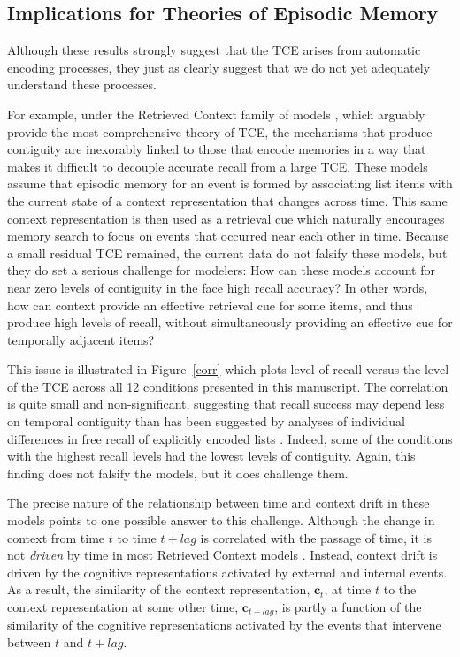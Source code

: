 \documentclass[man,natbib,floatsintext]{apa6} %
\begin{document}
\subsection{Implications for Theories of Episodic Memory}
Although these results strongly suggest that the TCE arises from automatic encoding processes, they just as clearly suggest that we do not yet adequately understand these processes.

For example, under the Retrieved Context family of models \citep[e.g.,][]{PolyEtal09,LohnEtal14,HealKaha15}, which arguably provide the most comprehensive theory of TCE, the mechanisms that produce contiguity are inexorably linked to those that encode memories in a way that makes it difficult to decouple accurate recall from a large TCE. These models assume that episodic memory for an event is formed by associating list items with the current state of a context representation that changes across time. This same context representation is then used as a retrieval cue which naturally encourages memory search to focus on events that occurred near each other in time. Because a small residual TCE remained, the current data do not falsify these models, but they do set a serious challenge for modelers: How can these models account for near zero levels of contiguity in the face high recall accuracy? In other words, how can context provide an effective retrieval cue for some items, and thus produce high levels of recall, without simultaneously providing an effective cue for temporally adjacent items?

This issue is illustrated in Figure~\ref{corr} which plots level of recall versus the level of the TCE across all 12 conditions presented in this manuscript. The correlation is quite small and non-significant\color{black}, suggesting that recall success may depend less on temporal contiguity than has been suggested by analyses of individual differences in free recall of explicitly encoded lists \citep{SedeEtal10,HealEtal14}. Indeed, some of the conditions with the highest recall levels had the lowest levels of contiguity. Again, this finding does not falsify the models, but it does challenge them.

The precise nature of the relationship between time and context drift in these models points to one possible answer to this challenge. Although the change in context from time $t$ to time $t+lag$ is correlated with the passage of time, it is not \emph{driven} by time in most Retrieved Context models \citep[but see][for a model in which drift is driven by time]{HowaEtal14a}. Instead, context drift is driven by the cognitive representations activated by external and internal events. As a result, the similarity of the context representation, $\mathbf{c}_t$, at time $t$ to the context representation at some other time, $\mathbf{c}_{t+lag}$, is partly a function of the similarity of the cognitive representations activated by the events that intervene between $t$ and $t+lag$. 
\end{document}
